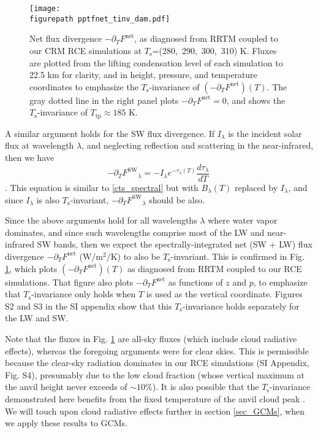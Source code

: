 \documentclass[9pt,twocolumn,twoside,lineno]{pnas-new}
\newcommand{\beqn}{\begin{equation}}
\newcommand{\eeqn}{\end{equation}}
\newcommand{\der}[2]{\ensuremath{\frac{d #1}{d #2}}}
\newcommand{\ppt}{\ensuremath{\partial_T}}
\newcommand{\FSW}{\ensuremath{F^\mathrm{SW}}}
\newcommand{\Fnet}{\ensuremath{F^\mathrm{net}}}
\newcommand{\tauk}{\ensuremath{\tau_\lambda}}
\newcommand{\Wmsq}{\ensuremath{\mathrm{W/m^2}}}
\newcommand{\Ts}{\ensuremath{T_\mathrm{s}}}
\newcommand{\Ttp}{\ensuremath{T_\mathrm{tp}}}
\newcommand{\figurepath}{./}
\begin{document}
\begin{figure}[t]
	\begin{center}
			\texttt{[image: \\figurepath pptfnet\_tinv\_dam.pdf]}
		\caption{Net flux divergence  $-\ppt \Fnet$, as diagnosed from RRTM coupled to our CRM RCE simulations at \Ts=(280,\ 290,\ 300,\ 310) K. Fluxes are plotted from the lifting condensation level of each simulation to 22.5 km for clarity, and  in height, pressure, and temperature coordinates to emphasize the \Ts-invariance of  $(-\ppt \Fnet)(T)$. The gray dotted line in the right panel plots $-\ppt \Fnet = 0$, and shows the \Ts-invariance of $\Ttp \approx 185$ K.
		\label{pptfnet_tinv_dam}
		}
	\end{center}
\end{figure}

	A similar argument holds for the SW flux divergence. If $I_\lambda$ is the incident solar flux at wavelength $\lambda$, and  neglecting reflection and scattering in the  near-infrared, 
then  we have
	\beqn
		-\ppt \FSW_\lambda = - I_\lambda e^{-\tauk(T)} \der{\tauk}{T}
		\
	\eeqn
\cite[][eqn. 9.26]{thomas2002}. This equation is similar to  \eqref{cts_spectral} but with $B_\lambda(T)$ replaced by $I_\lambda$, and since $I_\lambda$ is also \Ts-invariant, $-\ppt \FSW_\lambda$ should be also.

Since the above arguments hold for all wavelengths $\lambda$ where water vapor dominates, and  since such wavelengths comprise most of the LW and near-infrared SW bands,  then we expect the spectrally-integrated net (SW + LW)  flux divergence $-\ppt \Fnet$ ($\Wmsq/\mathrm{K}$) to also be \Ts-invariant. This is confirmed in  Fig.  \ref{pptfnet_tinv_dam}, which plots $(-\ppt \Fnet)(T)$ as diagnosed from RRTM coupled to our  RCE simulations.  That figure also plots $-\ppt \Fnet$ as functions of $z$ and $p$, to emphasize that \Ts-invariance only holds  when $T$ is used as the vertical coordinate. Figures S2 and S3 in  the SI appendix show that this \Ts-invariance holds separately for the LW and SW.

Note that the fluxes in Fig.  \ref{pptfnet_tinv_dam} are all-sky fluxes (which include cloud radiative effects), whereas the foregoing arguments were for clear skies. This is permissible because the clear-sky radiation dominates in our RCE simulations (SI Appendix, Fig. S4), presumably due to the low cloud fraction (whose vertical maximum at the anvil height never exceeds of $\sim 10 \%$). It is also possible that the \Ts-invariance demonstrated here benefits from the fixed temperature of the anvil cloud peak \cite[FAT,][]{hartmann2002,kuang2007,harrop2012}. We will touch upon cloud radiative effects further in section \ref{sec_GCMs}, when we apply these results to GCMs.
 
\end{document}
